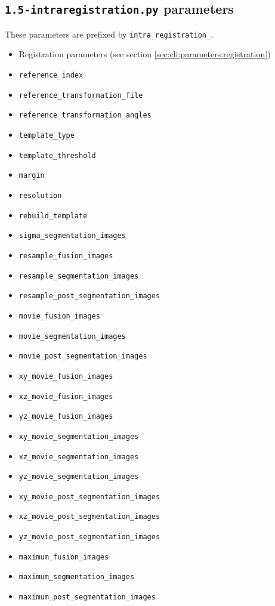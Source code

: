 \subsection{\texttt{1.5-intraregistration.py} parameters}
\label{sec:cli:parameters:intraregistration}

These parameters are prefixed by \texttt{intra\_registration\_}.
\begin{itemize}
\itemsep -0.5ex
\item Registration parameters 
(see section \ref{sec:cli:parameters:registration}) 
\item \texttt{reference\_index}
\item \texttt{reference\_transformation\_file}
\item \texttt{reference\_transformation\_angles}
\item \texttt{template\_type}
\item \texttt{template\_threshold}
\item \texttt{margin}
\item \texttt{resolution}
\item \texttt{rebuild\_template}
\item \texttt{sigma\_segmentation\_images}
\item \texttt{resample\_fusion\_images}
\item \texttt{resample\_segmentation\_images}
\item \texttt{resample\_post\_segmentation\_images}
\item \texttt{movie\_fusion\_images}
\item \texttt{movie\_segmentation\_images}
\item \texttt{movie\_post\_segmentation\_images}
\item \texttt{xy\_movie\_fusion\_images}
\item \texttt{xz\_movie\_fusion\_images}
\item \texttt{yz\_movie\_fusion\_images}
\item \texttt{xy\_movie\_segmentation\_images}
\item \texttt{xz\_movie\_segmentation\_images}
\item \texttt{yz\_movie\_segmentation\_images}
\item \texttt{xy\_movie\_post\_segmentation\_images}
\item \texttt{xz\_movie\_post\_segmentation\_images}
\item \texttt{yz\_movie\_post\_segmentation\_images}
\item \texttt{maximum\_fusion\_images}
\item \texttt{maximum\_segmentation\_images}
\item \texttt{maximum\_post\_segmentation\_images}
\end{itemize}

